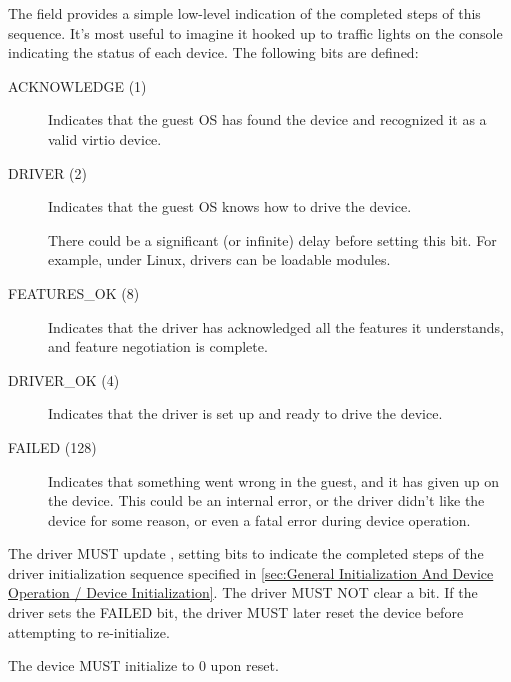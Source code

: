 The  field provides a simple low-level
indication of the completed steps of this sequence.
It's most useful to imagine it hooked up to traffic
lights on the console indicating the status of each device.  The
following bits are defined:
\begin{description}
\item[ACKNOWLEDGE (1)] Indicates that the guest OS has found the
  device and recognized it as a valid virtio device.

\item[DRIVER (2)] Indicates that the guest OS knows how to drive the
  device.
  \begin{note}
    There could be a significant (or infinite) delay before setting
    this bit.  For example, under Linux, drivers can be loadable modules.
  \end{note}

\item[FEATURES_OK (8)] Indicates that the driver has acknowledged all the
  features it understands, and feature negotiation is complete.

\item[DRIVER_OK (4)] Indicates that the driver is set up and ready to
  drive the device.

\item[FAILED (128)] Indicates that something went wrong in the guest,
  and it has given up on the device. This could be an internal
  error, or the driver didn't like the device for some reason, or
  even a fatal error during device operation.
\end{description}

The driver MUST update ,
setting bits to indicate the completed steps of the driver
initialization sequence specified in
\ref{sec:General Initialization And Device Operation / Device
Initialization}.
The driver MUST NOT clear a
 bit.  If the driver sets the FAILED bit,
the driver MUST later reset the device before attempting to re-initialize.

The device MUST initialize  to 0 upon reset.

